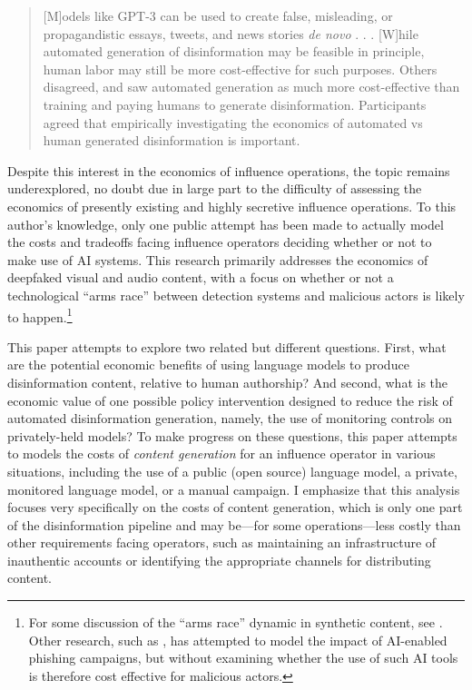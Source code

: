 \documentclass{article}
\begin{document}
\begin{quote}
  [M]odels like GPT-3 can be used to create false, misleading, or propagandistic essays, tweets, and news stories \textit{de novo} . . . [W]hile automated generation of disinformation may be feasible in principle, human labor may still be more cost-effective for such purposes. Others disagreed, and saw automated generation as much more cost-effective than training and paying humans to generate disinformation. Participants agreed that empirically investigating the economics of automated vs human generated disinformation is important. \cite{symposium}
\end{quote}

Despite this interest in the economics of influence operations, the topic remains underexplored, no doubt due in large part to the difficulty of assessing the economics of presently existing and highly secretive influence operations. To this author's knowledge, only one public attempt has been made to actually model the costs and tradeoffs facing influence operators deciding whether or not to make use of AI systems. \cite{hwang} This research primarily addresses the economics of deepfaked visual and audio content, with a focus on whether or not a technological ``arms race'' between detection systems and malicious actors is likely to happen.\footnote{For some discussion of the ``arms race'' dynamic in synthetic content, see \cite{armsrace}. Other research, such as \cite{swordsorshields}, has attempted to model the impact of AI-enabled phishing campaigns, but without examining whether the use of such AI tools is therefore cost effective for malicious actors.} 

This paper attempts to explore two related but different questions. First, what are the potential economic benefits of using language models to produce disinformation content, relative to human authorship? And second, what is the economic value of one possible policy intervention designed to reduce the risk of automated disinformation generation, namely, the use of monitoring controls on privately-held models? To make progress on these questions, this paper attempts to models the costs of \textit{content generation} for an influence operator in various situations, including the use of a public (open source) language model, a private, monitored language model, or a manual campaign. I emphasize that this analysis focuses very specifically on the costs of content generation, which is only one part of the disinformation pipeline and may be—for some operations—less costly than other requirements facing operators, such as maintaining an infrastructure of inauthentic accounts or identifying the appropriate channels for distributing content. \cite{goldsteinpanel, sedova1}
\end{document}
